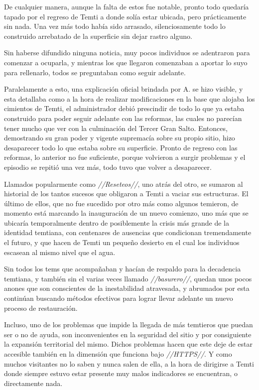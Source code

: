 \documentclass[
  spanish,
]{book}
\begin{document}
De cualquier manera, aunque la falta de estos fue notable, pronto todo quedaría tapado por el regreso de Temti a donde solía estar ubicada, pero prácticamente sin nada. Una vez más todo había sido arrasado, silenciosamente todo lo construido arrebatado de la superficie sin dejar rastro alguno.

Sin haberse difundido ninguna noticia, muy pocos individuos se adentraron para comenzar a ocuparla, y mientras los que llegaron comenzaban a aportar lo suyo para rellenarlo, todos se preguntaban como seguir adelante.

Paralelamente a esto, una explicación oficial brindada por A. se hizo visible, y esta detallaba como a la hora de realizar modificaciones en la base que alojaba los cimientos de Temti, el administrador debió prescindir de todo lo que ya estaba construido para poder seguir adelante con las reformas, las cuales no parecían tener mucho que ver con la culminación del Tercer Gran Salto. Entonces, demostrando su gran poder y vigente supremacía sobre su propio sitio, hizo desaparecer todo lo que estaba sobre su superficie. Pronto de regreso con las reformas, lo anterior no fue suficiente, porque volvieron a surgir problemas y el episodio se repitió una vez más, todo tuvo que volver a desaparecer.

Llamados popularmente como \emph{//Reseteos//}, uno atrás del otro, se sumaron al historial de los tantos sucesos que obligaron a Temti a vaciar sus estructuras. El último de ellos, que no fue sucedido por otro más como algunos temieron, de momento está marcando la inauguración de un nuevo comienzo, uno más que se ubicaría temporalmente dentro de posiblemente la crisis más grande de la identidad temtiana, con centenares de ausencias que condicionan tremendamente el futuro, y que hacen de Temti un pequeño desierto en el cual los individuos escasean al mismo nivel que el agua.

Sin todos los tems que acompañaban y hacían de respaldo para la decadencia temtiana, y también sin el varias veces llamado \emph{//basurero//}, quedan unos pocos anones que son conscientes de la inestabilidad atravesada, y abrumados por esta continúan buscando métodos efectivos para lograr llevar adelante un nuevo proceso de restauración.

Incluso, uno de los problemas que impide la llegada de más temtieros que puedan ser o no de ayuda, son inconvenientes en la seguridad del sitio y por consiguiente la expansión territorial del mismo. Dichos problemas hacen que este deje de estar accesible también en la dimensión que funciona bajo \emph{//HTTPS//}. Y como muchos visitantes no lo saben y nunca salen de ella, a la hora de dirigirse a Temti donde siempre estuvo estar presente muy malos indicadores se encuentran, o directamente nada.
\end{document}
